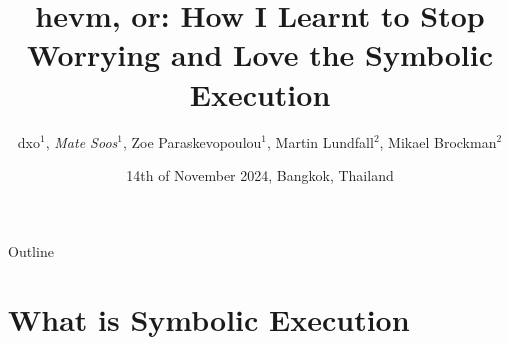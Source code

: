 \documentclass[aspectratio=169]{beamer}
\title[hevm]{hevm, or: How I Learnt to Stop Worrying and Love the Symbolic Execution}
\author[dxo, Soos, Paraskevopoulou, Lundfall, Brockmann]{dxo$^{1}$, \emph{Mate Soos$^{1}$}, Zoe Paraskevopoulou$^{1}$, Martin Lundfall$^{2}$, Mikael Brockman$^{2}$}
\institute[]{$^{1}$ Argot Collective, $^{2}$ Independent Researcher}
\date{14th of November 2024, Bangkok, Thailand}
\begin{document}
\begin{frame}
    \titlepage 
\end{frame}

%

\begin{frame}{Outline}
    \tableofcontents
\end{frame}

\section{What is Symbolic Execution}


\end{document}
